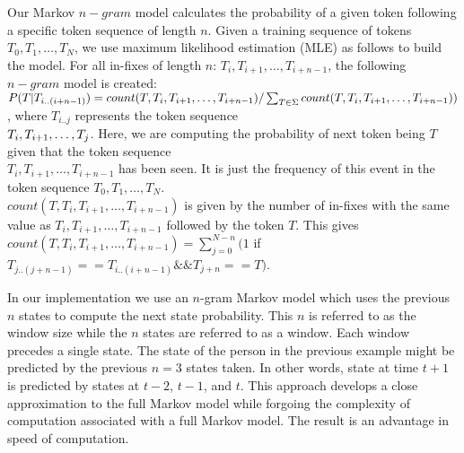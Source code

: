Our Markov $n-gram$ model calculates the probability of a given token following a specific 
token sequence of length $n$.
Given a training sequence of tokens $T_0, T_1, \dots , T_N$,
we use maximum likelihood estimation (MLE) as follows to build the model.
%
For all in-fixes of
length $n$: $T_i, T_{i+1}, \dots , T_{i+n-1}$,
the following $n-gram$ model is created:
$P(T | T_{i..(i+n-1)}) =  count(T, T_i, T_{i+1}, \dots , T_{i+n-1})/\sum_{T \in \Sigma} count(
T, T_i, T_{i+1}, \dots , \\T_{i+n-1}))$, where $T_{i..j}$ represents the
token sequence \\
$T_i, T_{i+\\1}, \dots, T_j$.
Here, we are computing the probability of next token being $T$
given that the token sequence \\
$T_i, T_{i+1}, \dots , T_{i+n-1}$ has been seen.
It is just the
frequency of this event in the token sequence $T_0, T_1, \dots , T_N$. \\
$count(T, T_i, T_{i+1}, \dots , T_{i+n-1})$ is given by the number of in-fixes with the same value as
$T_i, T_{i+1}, \dots , T_{i+n-1}$ followed by the token $T$. This gives 
$count(T, T_i, T_{i+1}, \dots , T_{i+n-1}) = \sum_{j=0}^{N-n}(1$ if $T_{j..(j+n-1)} == T_{i..(i+n-1)} \&\&
T_{j+n} == T)$.

In our implementation we use an
$n$-gram Markov model which uses the
previous $n$ states to compute the
next state probability.
%
This $n$ is referred to as the window size
while the $n$ states are
referred to as a window.
Each window precedes a single state.
%
The state of the person in the
previous example might be predicted by
the previous $n = 3$ states taken.
In other words,
state at time $t+1$ is predicted by
states at $t-2$, $t-1$, and $t$.
%
This approach develops a close approximation
to the full Markov model while
forgoing the complexity of computation
associated with 
a full Markov model.
The result is an advantage in 
speed of computation.

